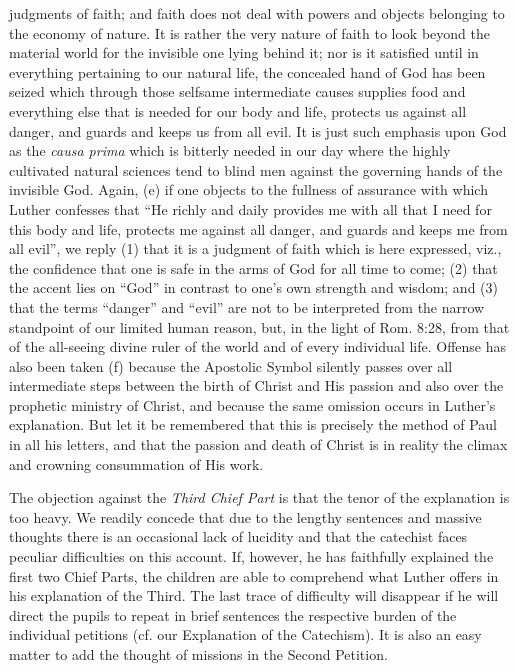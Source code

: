 judgments of faith; and faith does not deal with powers and objects belonging to the economy of nature. It is rather the very nature of faith to look beyond the material world for the invisible one lying behind it; nor is it satisfied until in everything pertaining to our natural life, the concealed hand of God has been seized which through those selfsame intermediate causes supplies food and everything else that is needed for our body and life, protects us against all danger, and guards and keeps us from all evil. It is just such emphasis upon God as the \emph{causa prima} which is bitterly needed in our day where the highly cultivated natural sciences tend to blind men against the governing hands of the invisible God. Again, (e) if one objects to the fullness of assurance with which Luther confesses that “He richly and daily provides me with all that I need for this body and life, protects me against all danger, and guards and keeps me from all evil”, we reply (1) that it is a judgment of faith which is here expressed, viz., the confidence that one is safe in the arms of God for all time to come; (2) that the accent lies on “God” in contrast to one’s own strength and wisdom; and (3) that the terms “danger” and “evil” are not to be interpreted from the narrow standpoint of our limited human reason, but, in the light of Rom. 8:28, from that of the all-seeing divine ruler of the world and of every individual life. Offense has also been taken (f) because the Apostolic Symbol silently passes over all intermediate steps between the birth of Christ and His passion and also over the prophetic ministry of Christ, and because the same omission occurs in Luther’s explanation. But let it be remembered that this is precisely the method of Paul in all his letters, and that the passion and death of Christ is in reality the climax and crowning consummation of His work.

The objection against the \emph{Third Chief Part} is that the tenor of the explanation is too heavy. We readily concede that due to the lengthy sentences and massive thoughts there is an occasional lack of lucidity and that the catechist faces peculiar difficulties on this account. If, however, he has faithfully explained the first two Chief Parts, the children are able to comprehend what Luther offers in his explanation of the Third. The last trace of difficulty will disappear if he will direct the pupils to repeat in brief sentences the respective burden of the individual petitions (cf. our Explanation of the Catechism). It is also an easy matter to add the thought of missions in the Second Petition.

